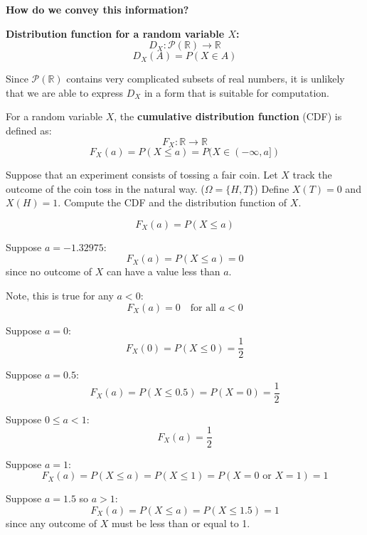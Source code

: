 \documentclass{article}
\begin{document}
    \textbf{How do we convey this information?}

    \textbf{Distribution function for a random variable \(X\):}
    \[
        D_X : \mathcal{P}(\mathbb{R}) \to \mathbb{R}
    \]
    \[
        D_X(A) = P(X \in A)
    \]

    Since \(\mathcal{P}(\mathbb{R})\) contains very complicated subsets of real numbers, it is unlikely that we are able to express \(D_X\) in a form that is suitable for computation.

    For a random variable \(X\), the \textbf{cumulative distribution function} (CDF) is defined as:
    \[
        F_X : \mathbb{R} \to \mathbb{R}
    \]
    \[
        F_X(a) = P(X \leq a) = P(X \in (-\infty, a])
    \]

    Suppose that an experiment consists of tossing a fair coin. Let \(X\) track the outcome of the coin toss in the natural way. (\(\Omega = \{H, T\}\)) Define \(X(T) = 0\) and \(X(H) = 1\). Compute the CDF and the distribution function of \(X\).

    \[
        F_X(a) = P(X \leq a)
    \]

    Suppose \(a = -1.32975\):
    \[
        F_X(a) = P(X \leq a) = 0
    \]
    since no outcome of \(X\) can have a value less than \(a\).

    Note, this is true for any \(a < 0\):
    \[
        F_X(a) = 0 \quad \text{for all } a < 0
    \]

    Suppose \(a = 0\):
    \[
        F_X(0) = P(X \leq 0) = \frac{1}{2}
    \]

    Suppose \(a = 0.5\):
    \[
        F_X(a) = P(X \leq 0.5) = P(X = 0) = \frac{1}{2}
    \]

    Suppose \(0 \leq a < 1\):
    \[
        F_X(a) = \frac{1}{2}
    \]

    Suppose \(a = 1\):
    \[
        F_X(a) = P(X \leq a) = P(X \leq 1) = P(X = 0 \text{ or } X = 1) = 1
    \]

    Suppose \(a = 1.5\) so \(a > 1\):
    \[
        F_X(a) = P(X \leq a) = P(X \leq 1.5) = 1
    \]
    since any outcome of \(X\) must be less than or equal to 1.
\end{document}
